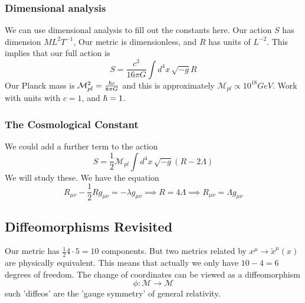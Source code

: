 \subsubsection{Dimensional analysis} 
We can use dimensional analysis to fill out the 
constants here. Our action $ S $ has dimension 
$ M L ^{ 2 } T ^{ - 1}  $, Our metric is dimensionless, and 
$ R $ has units of $ L ^{ - 2} $. This implies that 
our full action is 
\[
 S = \frac{ c ^ 3  }{  16 \pi G} \int d ^ 4 x \, \sqrt{ -g }  R
\]  Our Planck mass
is $ \mathcal{ M } _{ pl } ^ 2  = \frac{ \hbar c }{8 \pi G }$ and 
this is approximately $ \mathcal{ M } _{ pl } \propto 10 ^{ 18 } G eV $. 
Work with units with $ c = 1 $, and $ \hbar = 1 $. 

\subsubsection{The Cosmological Constant} 
We could add a further term to the action 
 \[
	 S = \frac{1}{2 } \mathcal{ M  }_{ pl } \int d ^ 4 x \, \sqrt{ - g}  ( R - 2 \Lambda ) 
\] We will study these. 
We have the equation 
\[
 R_{ \mu \nu } - \frac{1}{2 } R g _{ \mu \nu } = - \lambda g _{ \mu \nu } \implies 
 R = 4 \Lambda \implies R_{ \mu \nu }  = \Lambda g _{ \mu \nu }
\]

\subsection{Diffeomorphisms Revisited} 
Our metric has $ \frac{1}{2 } 4 \cdot  5  = 10 $ components. 
But two metrics related by $ x ^ \mu \to \tilde{x } ^ \mu ( x)  $ 
are physically equivalent. 
This means that actually we only have $ 10 - 4  = 6 $ degrees of freedom.
The change of coordinates can be viewed as a diffeomorphism 
\[
 \phi : \mathcal{ M } \to \mathcal{ M }
\] such 'diffeos' are the 'gauge symmetry' of general relativity. 
